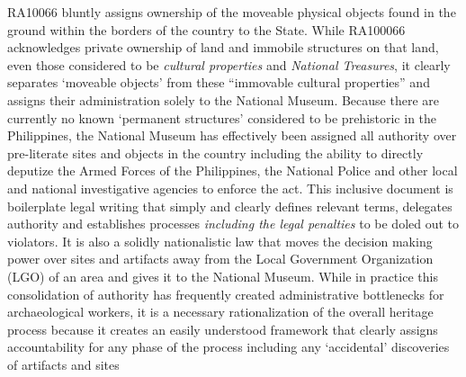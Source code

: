 RA10066 bluntly assigns ownership of the moveable physical objects found in the ground within the borders of the country to the State. While RA100066 acknowledges private ownership of land and immobile structures on that land, even those considered to be \textit{cultural properties} and \textit{National Treasures}, it clearly separates ‘moveable objects’ from these “immovable cultural properties” %
 and assigns their administration solely to the National Museum. Because there are currently no known ‘permanent structures’ considered to be prehistoric in the Philippines, the National Museum has effectively been assigned all authority over pre-literate sites and objects in the country including the ability to directly deputize the Armed Forces of the Philippines, the National Police and other local and national investigative agencies to enforce the act. 
This inclusive document is boilerplate legal writing that simply and clearly defines relevant terms, delegates authority and establishes processes \textit{including the legal penalties} to be doled out to violators. It is also a solidly nationalistic law that moves the decision making power over sites and artifacts away from the Local Government Organization (LGO) of an area and gives it to the National Museum. While in practice this consolidation of authority has frequently created administrative bottlenecks for archaeological workers, it is a necessary rationalization of the overall heritage process because it creates an easily understood framework that clearly assigns accountability for any phase of the process including any ‘accidental’ discoveries of artifacts and sites %

